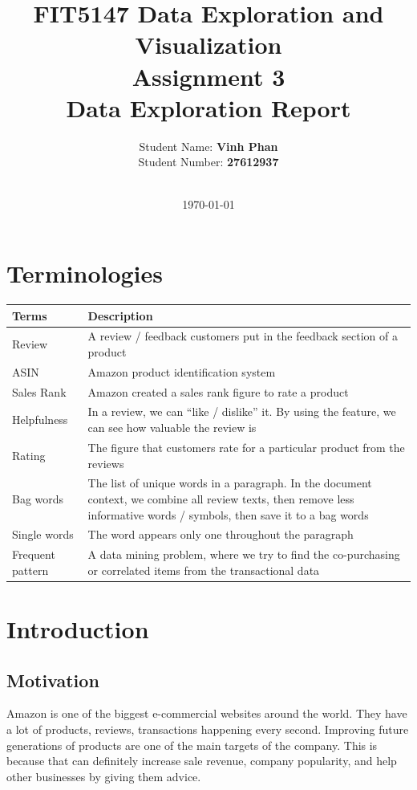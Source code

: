 \documentclass[a4paper,11pt]{article}
\begin{document}
\author{Student Name: \textbf{Vinh Phan} \\ Student Number: \textbf{27612937} \\\\}
\title{FIT5147 Data Exploration and Visualization \\ Assignment 3 \\ Data Exploration Report}
\date{\today}
\maketitle
\tableofcontents

\section{Terminologies}
	\begin{tabular}{|>{\centering\arraybackslash}p{3cm}||>{\arraybackslash}p{11cm}|}
	\hline 
	\textbf{Terms} & \textbf{Description} \\ 
	\hline 
	Review & A review / feedback customers put in the feedback section of a product \\ 
	\hline 
	ASIN & Amazon product identification system \\ 
	\hline 
	Sales Rank & Amazon created a sales rank figure to rate a product \\ 
	\hline 
	Helpfulness & In a review, we can “like / dislike” it. By using the feature, we can see how valuable the review is \\ 
	\hline 
	Rating & The figure that customers rate for a particular product from the reviews \\ 
	\hline 
	Bag words & The list of unique words in a paragraph. In the document context, we combine all review texts, then remove less informative words / symbols, then save it to a bag words \\ 
	\hline 
	Single words & The word appears only one throughout the paragraph \\ 
	\hline 
	Frequent pattern & A data mining problem, where we try to find the co-purchasing or correlated items from the transactional data \\ 
	\hline 
	\end{tabular} 

\newpage
\section{Introduction}
	\subsection{Motivation}
		Amazon is one of the biggest e-commercial websites around the world. They have a lot of products, reviews, transactions happening every second. Improving future generations of products are one of the main targets of the company. This is because that can definitely increase sale revenue, company popularity, and help other businesses by giving them advice.
		
\end{document}
